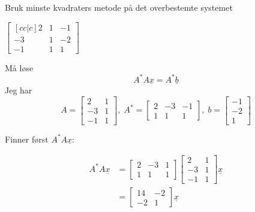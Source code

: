 \documentclass[11pt, a4paper, norsk]{NTNUoving}
\begin{document}
   \begin{oppgave}
       Bruk minste kvadraters metode på det overbestemte systemet
       \begin{punkt}
           $\begin{bmatrix}[cc|c]
               2 & 1 & -1 \\
               -3 & 1 & -2 \\
               -1 & 1 & 1
           \end{bmatrix}$
           
           Må løse \[A^{*}A\underline{x} = A^{*}\underline{b}\] Jeg har \[A=\begin{bmatrix}
               2 & 1 \\
               -3 & 1 \\
               -1 & 1
           \end{bmatrix}, \; A^{*} = \begin{bmatrix}
               2 & -3 & -1 \\
               1 & 1 & 1
           \end{bmatrix}, \; b = \begin{bmatrix}
               -1 \\
               -2 \\
               1
           \end{bmatrix} \]

           Finner først $A^{*}A\underline{x}$:

           \begin{align*}
               A^{*}A\underline{x} &= \begin{bmatrix}
                   2 & -3 & 1 \\
                   1 & 1 & 1
               \end{bmatrix}\begin{bmatrix}
                   2 & 1 \\
                   -3 & 1 \\
                   -1 & 1
               \end{bmatrix}\underline{x} 
               \\
                                   &= \begin{bmatrix}
                                       14 & -2 \\
                                       -2 & 1
                                   \end{bmatrix}\underline{x}
           \end{align*}


\end{punkt}
\end{oppgave}
\end{document}
